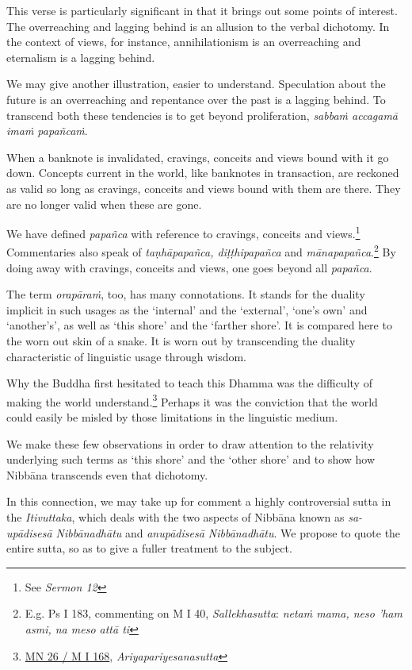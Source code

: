 This verse is particularly significant in that it brings out some points of interest. The overreaching and lagging behind is an allusion to the verbal dichotomy. In the context of views, for instance, annihilationism is an overreaching and eternalism is a lagging behind.

We may give another illustration, easier to understand. Speculation about the future is an overreaching and repentance over the past is a lagging behind. To transcend both these tendencies is to get beyond proliferation, \emph{sabbaṁ accagamā imaṁ papañcaṁ}.

When a banknote is invalidated, cravings, conceits and views bound with it go down. Concepts current in the world, like banknotes in transaction, are reckoned as valid so long as cravings, conceits and views bound with them are there. They are no longer valid when these are gone.

We have defined \emph{papañca} with reference to cravings, conceits and views.\footnote{See \emph{Sermon 12}} Commentaries also speak of \emph{taṇhāpapañca, diṭṭhipapañca} and \emph{mānapapañca}.\footnote{E.g. Ps I 183, commenting on M I 40, \emph{Sallekhasutta}: \emph{netaṁ mama, neso 'ham asmi, na meso attā ti}} By doing away with cravings, conceits and views, one goes beyond all \emph{papañca}.

The term \emph{orapāraṁ}, too, has many connotations. It stands for the duality implicit in such usages as the `internal' and the `external', `one's own' and `another's', as well as `this shore' and the `farther shore'. It is compared here to the worn out skin of a snake. It is worn out by transcending the duality characteristic of linguistic usage through wisdom.

Why the Buddha first hesitated to teach this Dhamma was the difficulty of making the world understand.\footnote{\href{https://suttacentral.net/mn26/pli/ms}{MN 26 / M I 168}, \emph{Ariyapariyesanasutta}} Perhaps it was the conviction that the world could easily be misled by those limitations in the linguistic medium.

We make these few observations in order to draw attention to the relativity underlying such terms as `this shore' and the `other shore' and to show how Nibbāna transcends even that dichotomy.

In this connection, we may take up for comment a highly controversial sutta in the \emph{Itivuttaka}, which deals with the two aspects of Nibbāna known as \emph{sa-upādisesā Nibbānadhātu} and \emph{anupādisesā Nibbānadhātu}. We propose to quote the entire sutta, so as to give a fuller treatment to the subject.

